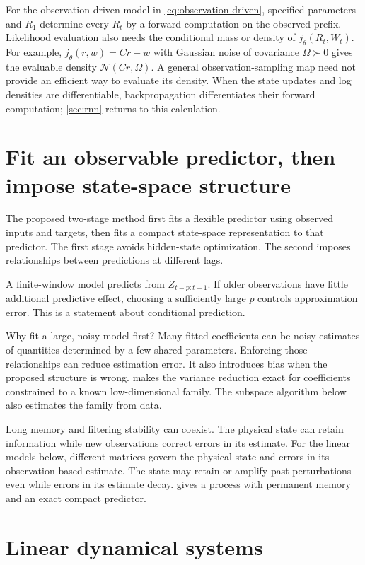 \documentclass[11pt,twoside]{article}
\theoremstyle{definition}
\theoremstyle{remark}
\begin{document}
For the observation-driven model in \cref{eq:observation-driven}, specified
parameters and \(R_1\) determine every \(R_t\) by a forward computation
on the observed prefix. Likelihood evaluation also needs the conditional
mass or density of \(j_\theta(R_t,W_t)\). For example,
\(j_\theta(r,w)=Cr+w\) with Gaussian noise of covariance \(\Omega\succ0\)
gives the evaluable density \(\mathcal N(Cr,\Omega)\).
A general observation-sampling map need not provide an efficient way to
evaluate its density. When the state updates and log densities are
differentiable, backpropagation differentiates their forward computation;
\cref{sec:rnn} returns to this calculation.

\section{Fit an observable predictor, then impose state-space structure}
\label{sec:observable-first}

The proposed two-stage method first fits a flexible predictor using
observed inputs and targets, then fits a compact state-space representation
to that predictor. The first stage avoids hidden-state optimization.
The second imposes relationships between predictions at different lags.

A finite-window model predicts from \(Z_{t-p:t-1}\). If older observations
have little additional predictive effect, choosing a sufficiently large
\(p\) controls approximation error. This is a statement about conditional
prediction.

Why fit a large, noisy model first? Many fitted coefficients can be noisy
estimates of quantities determined by a few shared parameters. Enforcing
those relationships can reduce estimation error. It also introduces bias
when the proposed structure is wrong.  makes the variance
reduction exact for coefficients constrained to a known low-dimensional
family. The subspace algorithm below also estimates the family from data.

Long memory and filtering stability can coexist. The physical state can
retain information while new observations correct errors in its estimate.
For the linear models below, different matrices govern the physical state
and errors in its observation-based estimate. The state may retain or
amplify past perturbations even while errors in its estimate decay.
 gives a process with permanent memory and an
exact compact predictor.

\section{Linear dynamical systems}
\label{sec:lds-model}
\end{document}
